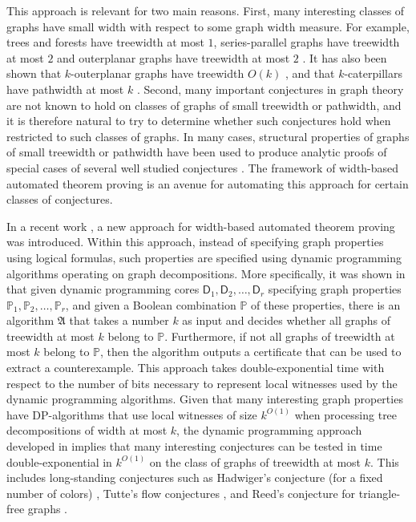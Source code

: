 \documentclass[11pt,a4paper]{article}
\newcommand{\treewidthvalue}{k}
\newcommand{\analgorithm}{\mathfrak{A}}
\newcommand{\graphproperty}{\mathbb{P}}
\newcommand{\dpcore}{\mathsf{D}}
\begin{document}
This approach is relevant for two main reasons. First, many interesting classes of graphs have small width with respect to some graph width measure. For example, trees and forests have treewidth at most $1$, series-parallel graphs have treewidth at most $2$ and outerplanar graphs have treewidth at most $2$ \cite{kloks1994treewidth,bodlaender1986classes,brandstadt1999graph}.
It has also been shown that $\treewidthvalue$-outerplanar graphs have treewidth $O(\treewidthvalue)$ \cite{biedl2015triangulating,kammer2007determining}, and that $\treewidthvalue$-caterpillars have pathwidth at most $\treewidthvalue$ \cite{proskurowski1996bandwidth}. Second, many important conjectures in graph theory are not known to hold on classes of graphs of small treewidth or pathwidth, and it is therefore natural to try to determine whether such conjectures hold when restricted to such classes of graphs.
In many cases, structural properties of graphs of small treewidth or pathwidth have been used to produce analytic proofs of special cases of several well studied conjectures  \cite{guan1999game,campos2013dominating,heldt2014bend,hell2000circular,pinlou2006oriented,zhou2007upper,pan2002tight}. The framework of width-based automated theorem proving is an avenue for automating this approach for certain classes of conjectures.



In a recent work \cite{de2023width}, a new approach for width-based automated theorem proving was introduced. Within this approach, instead of specifying graph properties using logical formulas, such properties are specified using dynamic programming algorithms operating on graph decompositions. More specifically, it was shown in \cite{de2023width} that given dynamic programming cores $\dpcore_1,\dpcore_2,\dots,\dpcore_r$ specifying graph properties $\graphproperty_1,\graphproperty_2,\dots,\graphproperty_r$, and given a Boolean combination $\graphproperty$ of these properties, there is an algorithm $\analgorithm$ that takes a number $\treewidthvalue$ as input and decides whether all graphs of treewidth at most $\treewidthvalue$ belong to $\graphproperty$. Furthermore, if not all graphs of treewidth at most $\treewidthvalue$ belong to $\graphproperty$, then the algorithm outputs a certificate that can be used to extract a counterexample.
This approach takes double-exponential time with respect to the number of bits necessary to represent local witnesses used by the dynamic programming algorithms. Given that many interesting graph properties have DP-algorithms that use local witnesses of size $\treewidthvalue^{O(1)}$ when processing tree decompositions of width at most $\treewidthvalue$, the dynamic programming approach developed in \cite{de2023width} implies that many interesting conjectures can be tested in time double-exponential in $\treewidthvalue^{O(1)}$ on the class of graphs of treewidth at most $\treewidthvalue$. This includes long-standing conjectures such as Hadwiger's conjecture (for a fixed number of colors) \cite{bollobas1980hadwiger}, Tutte's flow conjectures \cite{jacobsen2013five,peres2021tutte}, and Reed's conjecture for triangle-free graphs \cite{reed1998omega}.
\end{document}
